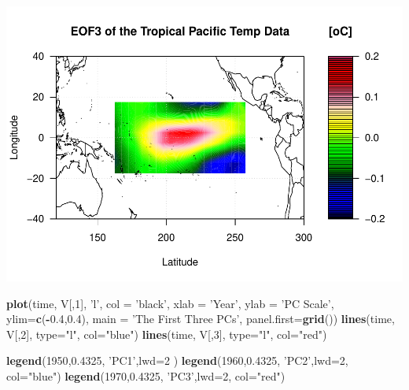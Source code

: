\documentclass[
]{article}
\newenvironment{Shaded}{\begin{snugshade}}{\end{snugshade}}
\newcommand{\DataTypeTok}[1]{\textcolor[rgb]{0.13,0.29,0.53}{#1}}
\newcommand{\DecValTok}[1]{\textcolor[rgb]{0.00,0.00,0.81}{#1}}
\newcommand{\FloatTok}[1]{\textcolor[rgb]{0.00,0.00,0.81}{#1}}
\newcommand{\KeywordTok}[1]{\textcolor[rgb]{0.13,0.29,0.53}{\textbf{#1}}}
\newcommand{\NormalTok}[1]{#1}
\newcommand{\OperatorTok}[1]{\textcolor[rgb]{0.81,0.36,0.00}{\textbf{#1}}}
\newcommand{\StringTok}[1]{\textcolor[rgb]{0.31,0.60,0.02}{#1}}
\begin{document}
\includegraphics{Assignment3_files/figure-latex/unnamed-chunk-1-3.pdf}

\begin{Shaded}
\begin{Highlighting}[]
\KeywordTok{plot}\NormalTok{(time, V[,}\DecValTok{1}\NormalTok{], }\StringTok{'l'}\NormalTok{, }\DataTypeTok{col =} \StringTok{'black'}\NormalTok{,}
     \DataTypeTok{xlab =} \StringTok{'Year'}\NormalTok{, }\DataTypeTok{ylab =} \StringTok{'PC Scale'}\NormalTok{, }\DataTypeTok{ylim=}\KeywordTok{c}\NormalTok{(}\OperatorTok{-}\FloatTok{0.4}\NormalTok{,}\FloatTok{0.4}\NormalTok{), }
     \DataTypeTok{main =} \StringTok{'The First Three PCs'}\NormalTok{, }\DataTypeTok{panel.first=}\KeywordTok{grid}\NormalTok{())}
\KeywordTok{lines}\NormalTok{(time, V[,}\DecValTok{2}\NormalTok{], }\DataTypeTok{type=}\StringTok{"l"}\NormalTok{, }\DataTypeTok{col=}\StringTok{"blue"}\NormalTok{)}
\KeywordTok{lines}\NormalTok{(time, V[,}\DecValTok{3}\NormalTok{], }\DataTypeTok{type=}\StringTok{"l"}\NormalTok{, }\DataTypeTok{col=}\StringTok{"red"}\NormalTok{)}


\KeywordTok{legend}\NormalTok{(}\DecValTok{1950}\NormalTok{,}\FloatTok{0.4325}\NormalTok{, }\StringTok{'PC1'}\NormalTok{,}\DataTypeTok{lwd=}\DecValTok{2}\NormalTok{ )}
\KeywordTok{legend}\NormalTok{(}\DecValTok{1960}\NormalTok{,}\FloatTok{0.4325}\NormalTok{, }\StringTok{'PC2'}\NormalTok{,}\DataTypeTok{lwd=}\DecValTok{2}\NormalTok{, }\DataTypeTok{col=}\StringTok{"blue"}\NormalTok{)}
\KeywordTok{legend}\NormalTok{(}\DecValTok{1970}\NormalTok{,}\FloatTok{0.4325}\NormalTok{, }\StringTok{'PC3'}\NormalTok{,}\DataTypeTok{lwd=}\DecValTok{2}\NormalTok{, }\DataTypeTok{col=}\StringTok{"red"}\NormalTok{)}
\end{Highlighting}
\end{Shaded}
\end{document}
